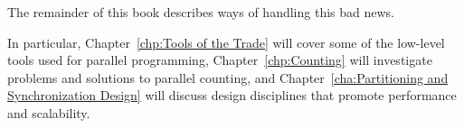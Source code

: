 The remainder of this book describes ways of handling this bad news.

In particular,
Chapter~\ref{chp:Tools of the Trade} will cover some of the low-level
tools used for parallel programming,
Chapter~\ref{chp:Counting} will investigate problems and solutions to
parallel counting, and
Chapter~\ref{cha:Partitioning and Synchronization Design}
will discuss design disciplines that promote performance and scalability.
